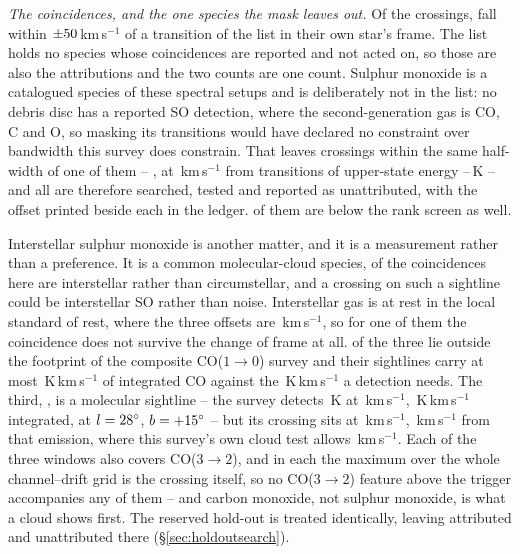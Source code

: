 \begin{table}
\centering
\footnotesize
\caption{The line mask, by species: the number $N$ of transitions, the
frequency range they span inside the searched intervals and their
upper-state energies.}
\label{tab:masklines}

\end{table}

\emph{The coincidences, and the one species the mask leaves out.} Of the
\NCross{} crossings, \MkNCoinc{} fall within $\pm50$\,km\,s$^{-1}$
of a transition of the list in their own star's frame. The list holds no
species whose coincidences are reported and not acted on, so those are also
the \MkAttr{} attributions and the two counts are one count. Sulphur monoxide is a catalogued species of these spectral
setups and is deliberately not in the list: no debris disc has a reported SO
detection, where the second-generation gas is CO, C and O, so masking its
\SoNTrans{} transitions would have declared no constraint over bandwidth this
survey does constrain. That leaves \SoNCrossWord{} crossings within the same
half-width of one of them -- \SoStars, at \SoDvList\,km\,s$^{-1}$ from
transitions of upper-state energy \SoEuLo--\SoEuHi\,K -- and all
\SoNCrossWord{} are therefore searched, tested and reported as unattributed,
with the offset printed beside each in the ledger. \SoNBelowScreen{} of them
are below the rank screen as well.

Interstellar sulphur monoxide is another matter, and it is a measurement
rather than a preference. It is a common molecular-cloud species, \LsNCloud{}
of the \MkNCoinc{} coincidences here are interstellar rather than
circumstellar, and a crossing on such a sightline could be interstellar SO
rather than noise. Interstellar gas is at rest in the local standard of rest,
where the three offsets are \SoDvLsrList\,km\,s$^{-1}$, so for one of them
the coincidence does not survive the change of frame at all. \SoNUncovered{}
of the three lie outside the footprint of the composite CO($1\to0$) survey and
their sightlines carry at most \SoPlanckMax\,K\,km\,s$^{-1}$ of integrated
CO against the \SoPlanckCeil\,K\,km\,s$^{-1}$ a detection needs. The third,
\SoCloudStar, is a molecular sightline -- the survey detects
\SoCloudTpeak\,K at \SoCloudVpeak\,km\,s$^{-1}$,
\SoCloudW\,K\,km\,s$^{-1}$ integrated, at $l=28^{\circ}$,
$b=+15^{\circ}$ -- but its crossing sits at
\SoCloudVfeat\,km\,s$^{-1}$, \SoCloudDv\,km\,s$^{-1}$ from that emission,
where this survey's own cloud test allows \LsCloudDvMax\,km\,s$^{-1}$. Each
of the three windows also covers CO($3\to2$), and in each the maximum over the
whole channel--drift grid is the crossing itself, so no CO($3\to2$) feature
above the trigger accompanies any of them -- and carbon monoxide, not sulphur
monoxide, is what a cloud shows first. The reserved hold-out is treated
identically, leaving \HoNAttr{} attributed and \HoNUnattr{} unattributed
there (\S\ref{sec:holdoutsearch}).

